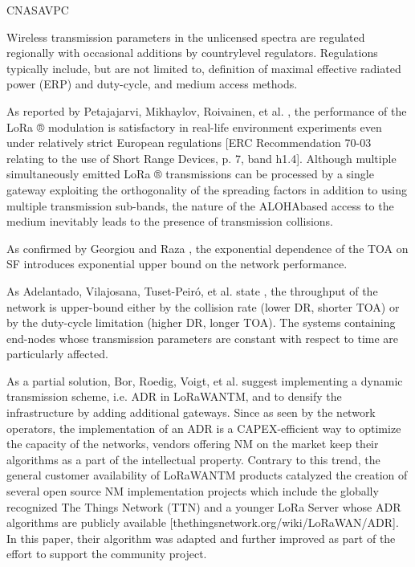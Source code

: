 \cite{hauser_proposal_2017} CNASAVPC

Wireless transmission parameters in the unlicensed spectra are regulated regionally with occasional additions by countrylevel regulators.
Regulations typically include,
	but are not limited to,
	definition of maximal effective radiated power (ERP) and duty-cycle,
	and medium access methods.

As reported by Petajajarvi,
	Mikhaylov,
	Roivainen,
	et al.
\cite{petajajarvi_coverage_2015},
	the performance of the LoRa ® modulation is satisfactory in real-life environment experiments even under relatively strict European regulations [ERC Recommendation 70-03 relating to the use of Short Range Devices,
	p. 7,
	band h1.4].
Although multiple simultaneously emitted LoRa ® transmissions can be processed by a single gateway exploiting the orthogonality of the spreading factors in addition to using multiple transmission sub-bands,
	the nature of the ALOHAbased access to the medium inevitably leads to the presence of transmission collisions.

As confirmed by Georgiou and Raza \cite{georgiou_low_2017},
	the exponential dependence of the TOA on SF introduces exponential upper bound on the network performance.

As Adelantado,
	Vilajosana,
	Tuset-Peiró,
	et al.
state \cite{adelantado_understanding_2017},
	the throughput of the network is upper-bound either by the collision rate (lower DR,
	shorter TOA) or by the duty-cycle limitation (higher DR,
	longer TOA).
The systems containing end-nodes whose transmission parameters are constant with respect to time are particularly affected.

As a partial solution,
	Bor,
	Roedig,
	Voigt,
	et al.
suggest \cite{bor_lora_2016} implementing a dynamic transmission scheme,
	i.e.
ADR in LoRaWANTM,
	and to densify the infrastructure by adding additional gateways.
Since as seen by the network operators,
	the implementation of an ADR is a CAPEX-efficient way to optimize the capacity of the networks,
	vendors offering NM on the market keep their algorithms as a part of the intellectual property.
Contrary to this trend,
	the general customer availability of LoRaWANTM products catalyzed the creation of several open source NM implementation projects which include the globally recognized The Things Network (TTN) and a younger LoRa Server whose ADR algorithms are publicly available [thethingsnetwork.org/wiki/LoRaWAN/ADR].
In this paper,
	their algorithm was adapted and further improved as part of the effort to support the community project.

